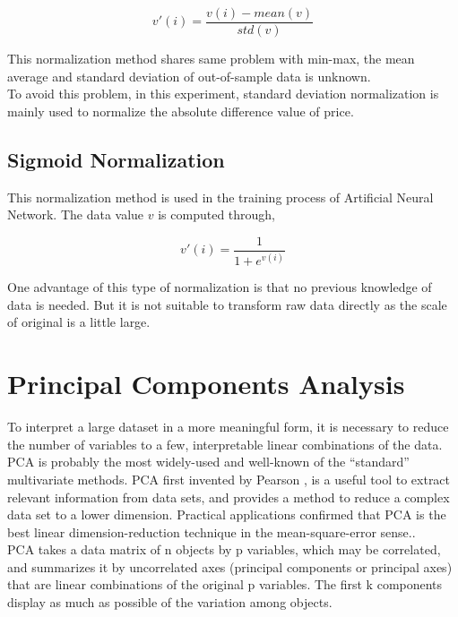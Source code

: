 \begin{equation}
v'(i)=\frac{v(i)-mean(v)}{std(v)}
\end{equation}

This normalization method shares same problem with min-max, the mean average and standard deviation of out-of-sample data is unknown. \\



To avoid this problem, in this experiment, standard deviation normalization is mainly used to normalize the absolute difference value of price.
\clearpage

\subsection{Sigmoid Normalization\cite{nayak2014impact}}
This normalization method is used in the training process of Artificial Neural Network. The data value $v$ is computed through,


\begin{equation}
v'(i)=\frac{1}{1+e^{v(i)}}
\end{equation}

One advantage of this type of normalization is that no previous knowledge of data is needed. But it is not suitable to transform raw data directly as the scale of original is a little large.


\section{Principal Components Analysis}

To interpret a large dataset in a more meaningful form, it is necessary to reduce the number of variables to a few, interpretable linear combinations of the data. PCA is probably the most widely-used and well-known of the “standard” multivariate methods. PCA first invented by Pearson \cite{peason1901lines}, is a useful tool to extract relevant information from data sets, and provides a method to reduce a complex data set to a lower dimension. Practical applications confirmed that PCA is the best linear dimension-reduction technique in the mean-square-error sense.\cite{4_kantardzic}. \\

PCA takes a data matrix of n objects by p variables, which may be correlated, and summarizes it by uncorrelated axes (principal components or principal axes) that are linear combinations of the original p variables. The first k components display as much as possible of the variation among objects.

